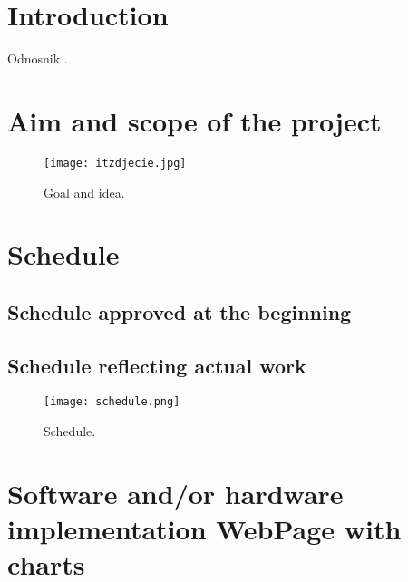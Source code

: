 \documentclass[oneside,a4paper,11pt]{report}
\begin{document}







\chapter{Introduction}





Odnosnik \cite{wikipedia}.

	


\chapter{Aim and scope of the project}

\begin{figure}
	\centering
	\texttt{[image: itzdjecie.jpg]}
	\caption{Goal and idea.\label{fig:Goal and Idea}}
\end{figure}
\chapter{Schedule}
\section{Schedule approved at the beginning}

\section{Schedule reflecting actual work}

\begin{figure}
	\centering
	\texttt{[image: schedule.png]}
	\caption{Schedule.\label{fig:Schedule}}
\end{figure}
\chapter{Software and/or hardware implementation WebPage with charts}
\end{document}
